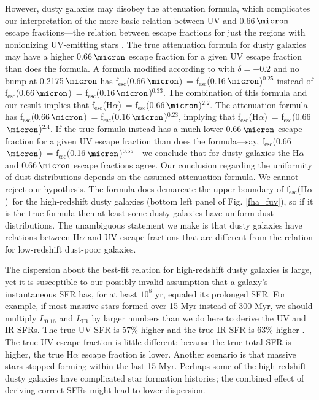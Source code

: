 \documentclass[preprint]{aastex}
\newcommand{\alephuv}{f$_{\mathrm{esc}}$(0.16$\,\micron$)}
\newcommand{\alephha}{f$_{\mathrm{esc}}$(H$\alpha$)}
\newcommand{\alephuvha}{f$_{\mathrm{esc}}$(0.66$\,\micron$)}
\begin{document}
However, dusty galaxies may disobey the \citet{calzetti00} attenuation
formula, which complicates our interpretation of the more basic relation
between UV and 0.66$\,\micron$ escape fractions---the relation between
escape fractions for just the regions with nonionizing UV-emitting stars
\citep{reddy10,reddy12,reddy15,buat11,buat12,penner12,kriek13}.  The true attenuation
formula for dusty galaxies may have a higher 0.66$\,\micron$ escape fraction
for a given UV escape fraction than does the \citet{calzetti00} formula.  A
formula modified according to
\citet{kriek13} with $\delta = -0.2$ and no bump at 0.2175$\,\micron$ has
\alephuvha~=
\alephuv$^{0.25}$ instead of \alephuvha~= \alephuv$^{0.33}$.  The combination of
this \citet{kriek13} formula and our result implies that
\alephha~= \alephuvha$^{2.2}$.  The \citep{reddy15} attenuation formula has
\alephuvha~= \alephuv$^{0.23}$, implying that \alephha~= \alephuvha$^{2.4}$.
If the true formula instead has a
much lower 0.66$\,\micron$ escape fraction for a given UV escape
fraction than does the \citet{calzetti00} formula---say, \alephuvha~=
\alephuv$^{0.55}$---we conclude that for dusty
galaxies the H$\alpha$ and 0.66$\,\micron$ escape fractions agree.  Our
conclusion regarding the uniformity of dust distributions depends on the
assumed attenuation formula.  We cannot reject our hypothesis.  The
\citet{calzetti00} formula does demarcate the upper boundary of \alephha~for the
high-redshift dusty galaxies (bottom left panel of Fig. \ref{fha_fuv}), so
if it is the true formula then at least some dusty galaxies have uniform
dust distributions.  The unambiguous statement we make is that dusty galaxies
have relations between H$\alpha$ and UV escape fractions that are different from
the relation for low-redshift dust-poor galaxies.

The dispersion about the best-fit relation for high-redshift dusty galaxies
is large, yet it is susceptible
to our possibly invalid assumption that a galaxy's instantaneous SFR has,
for at least $10^{8}$ yr, equaled its prolonged SFR.  For example, if most
massive stars formed over 15 Myr instead of 300 Myr, we should multiply
$L_{0.16}$ and $L_{\mathrm{IR}}$ by larger numbers than we do here to derive the
UV and IR SFRs.  The true UV SFR is 57\% higher and the true IR SFR is 63\%
higher \citep{madau14}.  The true UV escape fraction is little different;
because the true total SFR is higher, the true H$\alpha$ escape fraction is
lower.  Another scenario is that massive stars stopped forming within the last
15 Myr.  Perhaps some of the high-redshift dusty galaxies have
complicated star formation histories; the combined effect of deriving correct
SFRs might lead to lower dispersion.
\end{document}
